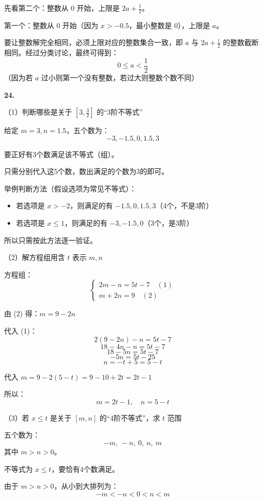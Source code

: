 先看第二个：整数从 0 开始，上限是 \(2a+\frac12\)。

第一个：整数从 0 开始（因为 \(x > -0.5\)，最小整数是 0），上限是 \(a\)。

要让整数解完全相同，必须上限对应的整数集合一致，即 \(a\) 与 \(2a+\frac12\) 的整数截断相同。经过分类讨论，最终可得到：
\[
\boxed{0 \leq a < \frac12}
\]
（因为若 \(a\) 过小则第一个没有整数，若过大则整数个数不同）

\bigskip

\textbf{24.}

（1）判断哪些是关于 \([3, \frac32]\) 的“3阶不等式”

给定 \(m=3, n=1.5\)，五个数为：
\[
-3, -1.5, 0, 1.5, 3
\]

要正好有3个数满足该不等式（组）。

只需分别代入这5个数，数出满足的个数为3的即可。

举例判断方法（假设选项为常见不等式）：
\begin{itemize}
\item 若选项是 \(x > -2\)，则满足的有 \(-1.5, 0, 1.5, 3\)（4个，不是3阶）
\item 若选项是 \(x \leq 1\)，则满足的有 \(-3, -1.5, 0\)（3个，是3阶）
\end{itemize}

所以只需按此方法逐一验证。

\bigskip

（2）解方程组用含 \(t\) 表示 \(m,n\)

方程组：
\[
\begin{cases}
2m - n = 5t - 7 \quad (1) \\
m + 2n = 9 \quad (2)
\end{cases}
\]

由 (2) 得：\(m = 9 - 2n\)

代入 (1)：
\[
2(9-2n) - n = 5t - 7
\]
\[
18 - 4n - n = 5t - 7
\]
\[
18 - 5n = 5t - 7
\]
\[
-5n = 5t - 25
\]
\[
n = -t + 5 = 5 - t
\]

代入 \(m = 9 - 2(5-t) = 9 - 10 + 2t = 2t - 1\)

所以：
\[
\boxed{m = 2t - 1,\quad n = 5 - t}
\]

\bigskip

（3）若 \(x \leq t\) 是关于 \([m,n]\) 的“4阶不等式”，求 \(t\) 范围

五个数为：
\[
-m,\ -n,\ 0,\ n,\ m
\]
其中 \(m > n > 0\)。

不等式为 \(x \leq t\)，要恰有4个数满足。

由于 \(m > n > 0\)，从小到大排列为：
\[
-m < -n < 0 < n < m
\]

